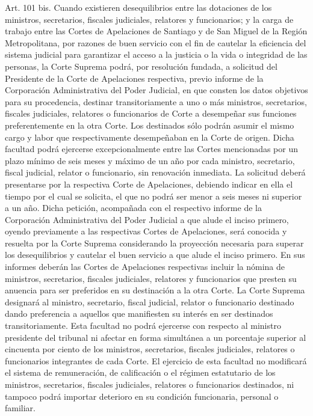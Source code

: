    Art. 101 bis. Cuando existieren desequilibrios entre las dotaciones de los ministros, secretarios, fiscales judiciales, relatores y funcionarios; y la carga de trabajo entre las Cortes de Apelaciones de Santiago y de San Miguel de la Región Metropolitana, por razones de buen servicio con el fin de cautelar la eficiencia del sistema judicial para garantizar el acceso a la justicia o la vida o integridad de las personas, la Corte Suprema podrá, por resolución fundada, a solicitud del Presidente de la Corte de Apelaciones respectiva, previo informe de la Corporación Administrativa del Poder Judicial, en que consten los datos objetivos para su procedencia, destinar transitoriamente a uno o más ministros, secretarios, fiscales judiciales, relatores o funcionarios de Corte a desempeñar sus funciones preferentemente en la otra Corte. Los destinados sólo podrán asumir el mismo cargo y labor que respectivamente desempeñaban en la Corte de origen.
    Dicha facultad podrá ejercerse excepcionalmente entre las Cortes mencionadas por un plazo mínimo de seis meses y máximo de un año por cada ministro, secretario, fiscal judicial, relator o funcionario, sin renovación inmediata.
    La solicitud deberá presentarse por la respectiva Corte de Apelaciones, debiendo indicar en ella el tiempo por el cual se solicita, el que no podrá ser menor a seis meses ni superior a un año. Dicha petición, acompañada con el respectivo informe de la Corporación Administrativa del Poder Judicial a que alude el inciso primero, oyendo previamente a las respectivas Cortes de Apelaciones, será conocida y resuelta por la Corte Suprema considerando la proyección necesaria para superar los desequilibrios y cautelar el buen servicio a que alude el inciso primero. En sus informes deberán las Cortes de Apelaciones respectivas incluir la nómina de ministros, secretarios, fiscales judiciales, relatores y funcionarios que presten su anuencia para ser preferidos en su destinación a la otra Corte.
    La Corte Suprema designará al ministro, secretario, fiscal judicial, relator o funcionario destinado dando preferencia a aquellos que manifiesten su interés en ser destinados transitoriamente.
    Esta facultad no podrá ejercerse con respecto al ministro presidente del tribunal ni afectar en forma simultánea a un porcentaje superior al cincuenta por ciento de los ministros, secretarios, fiscales judiciales, relatores o funcionarios integrantes de cada Corte.
    El ejercicio de esta facultad no modificará el sistema de remuneración, de calificación o el régimen estatutario de los ministros, secretarios, fiscales judiciales, relatores o funcionarios destinados, ni tampoco podrá importar deterioro en su condición funcionaria, personal o familiar.
